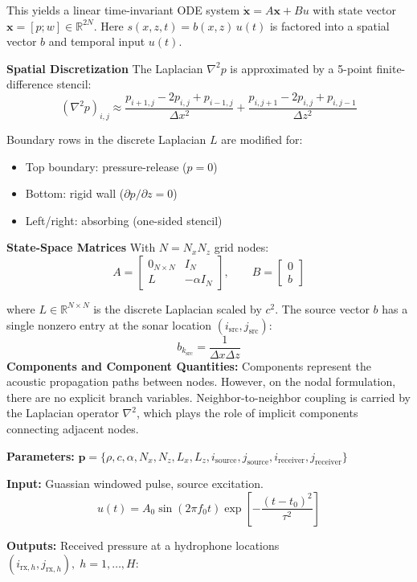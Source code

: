 \documentclass[11pt]{article}
\begin{document}
This yields a linear time-invariant ODE system $
\dot{\mathbf{x}} = A\mathbf{x} + B u$ with state vector $\mathbf{x} = [p; w] \in \mathbb{R}^{2N}$. Here $s(x,z,t) = b(x,z)\,u(t)$ is factored into a spatial vector $b$ and temporal input $u(t)$.

\textbf{Spatial Discretization} The Laplacian $\nabla^2 p$ is approximated by a 5-point finite-difference stencil:
\[
(\nabla^2 p)_{i,j} \approx
\frac{p_{i+1,j}-2p_{i,j}+p_{i-1,j}}{\Delta x^2} +
\frac{p_{i,j+1}-2p_{i,j}+p_{i,j-1}}{\Delta z^2}
\]

Boundary rows in the discrete Laplacian $L$ are modified for:
\begin{itemize}
    \item Top boundary: pressure-release ($p=0$)
    \item Bottom: rigid wall ($\partial p/\partial z=0$)
    \item Left/right: absorbing (one-sided stencil)
\end{itemize}

\textbf{State-Space Matrices} With $N=N_x N_z$ grid nodes:
\[
A = 
\begin{bmatrix}
0_{N\times N} & I_{N} \\
L & -\alpha I_{N}
\end{bmatrix},
\qquad
B = \begin{bmatrix} 0 \\ b \end{bmatrix}
\]

where $L \in \mathbb{R}^{N\times N}$ is the discrete Laplacian scaled by $c^2$.  
The source vector $b$ has a single nonzero entry at the sonar location $(i_\mathrm{src},j_\mathrm{src})$:
\[
b_{k_\mathrm{src}} = \frac{1}{\Delta x \Delta z}
\]
\textbf{Components and Component Quantities:} Components represent the acoustic propagation paths between nodes. However, on the nodal formulation, there are no explicit branch variables. Neighbor-to-neighbor coupling is carried by the Laplacian operator $\nabla^2$, which plays the role of implicit components connecting adjacent nodes.

\textbf{Parameters:}
$\mathbf{p} = \{\rho, c, \alpha, N_x, N_z, L_x, L_z, i_\mathrm{source}, j_\mathrm{source}, i_\mathrm{receiver}, j_\mathrm{receiver}\}\
$

\textbf{Input:} Guassian windowed pulse, source excitation.
\[
u(t) = A_0 \sin(2\pi f_0 t) \exp\!\left[-\frac{(t-t_0)^2}{\tau^2}\right]
\]

\textbf{Outputs:} Received pressure at a hydrophone locations $(i_{\mathrm{rx},h},j_{\mathrm{rx},h}), \; h=1,\dots,H$:
\end{document}
